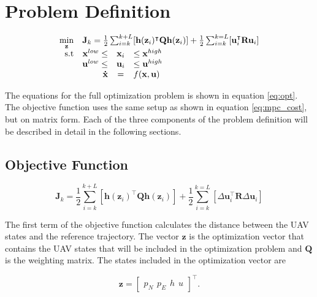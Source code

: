 \section{Problem Definition}

\begin{equation}
\label{eq:opt}
	\begin{array}{rrclcl}
		\displaystyle \min_{\mathbf{z}} & \multicolumn{3}{l}{\mathbf{J}_k = \frac{1}{2} \sum_{i=k}^{k+L} [\mathbf{h}(\mathbf{z}_i)^\intercal \mathbf{Q}\mathbf{h}(\mathbf{z}_i)] + \frac{1}{2}\sum_{i=k}^{k=L}[\mathbf{u}_i^\intercal \mathbf{R}\mathbf{u}_i]}\\
		\textrm{s.t}
		& \mathbf{x}^{low} \leq & \mathbf{x}_i & \leq \mathbf{x}^{high} \\
		& \mathbf{u}^{low} \leq & \mathbf{u}_i & \leq \mathbf{u}^{high} \\
		& \displaystyle \mathbf{\dot{x}} & = & f(\mathbf{x},\mathbf{u})
	\end{array}
\end{equation}

The equations for the full optimization problem is shown in equation \ref{eq:opt}. The objective function uses the same setup as shown in equation \ref{eq:mpc_cost}, but on matrix form. Each of the three components of the problem definition will be described in detail in the following sections.


\subsection{Objective Function}

\begin{equation}
	\label{eq:objective_function}
	\mathbf{J}_k = \frac{1}{2} \sum_{i=k}^{k+L} [\mathbf{h}(\mathbf{z}_i)^\intercal \mathbf{Q}\mathbf{h}(\mathbf{z}_i)] + \frac{1}{2}\sum_{i=k}^{k=L}[\Delta\mathbf{u}_i^\intercal \mathbf{R}\Delta\mathbf{u}_i]
\end{equation}

The first term of the objective function calculates the distance between the UAV states and the reference trajectory. The vector $\mathbf{z}$ is the optimization vector that contains the UAV states that will be included in the optimization problem and $\mathbf{Q}$ is the weighting matrix. The states included in the optimization vector are

\begin{equation}
	\mathbf{z} =
	\begin{bmatrix}
		p_N \hspace{5pt} p_E \hspace{5pt} h \hspace{5pt} u
	\end{bmatrix} ^\intercal .
\end{equation}

